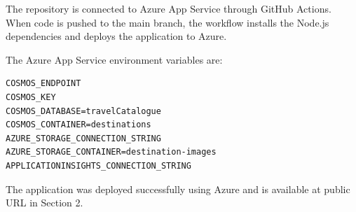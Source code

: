 \documentclass[12pt,a4paper]{article}
\begin{document}
The repository is connected to Azure App Service through GitHub Actions. When code is pushed to the main branch, the workflow installs the Node.js dependencies and deploys the application to Azure.

The Azure App Service environment variables are:

\begin{verbatim}
COSMOS_ENDPOINT
COSMOS_KEY
COSMOS_DATABASE=travelCatalogue
COSMOS_CONTAINER=destinations
AZURE_STORAGE_CONNECTION_STRING
AZURE_STORAGE_CONTAINER=destination-images
APPLICATIONINSIGHTS_CONNECTION_STRING
\end{verbatim}

The application was deployed successfully using Azure and is available at public URL in Section 2.





\end{document}
